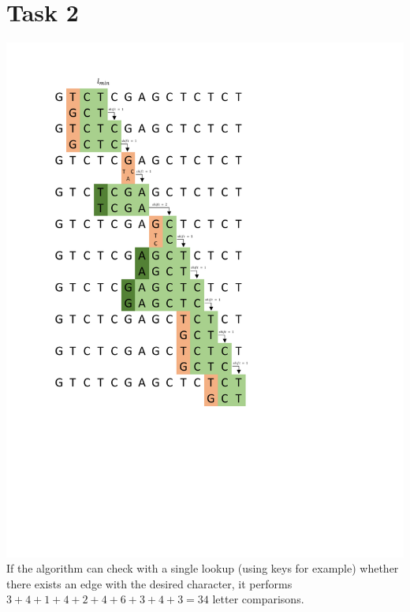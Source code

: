 \documentclass[10pt,a4paper]{article}
\begin{document}
	\section*{Task 2}
		\includegraphics[width = \textwidth, trim=2cm 6cm 4cm 1cm,clip]{task2.pdf}
		If the algorithm can check with a single lookup (using keys for example) whether there exists an edge with the desired character, it performs $3+4+1+4+2+4+6+3+4+3 = 34$ letter comparisons. 
\end{document}
